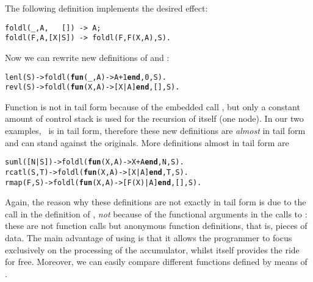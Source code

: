 The following definition implements the desired effect:
\begin{verbatim}
foldl(_,A,   []) -> A;
foldl(F,A,[X|S]) -> foldl(F,F(X,A),S).
\end{verbatim}
Now we can rewrite new definitions of  and
:
\begin{alltt}
lenl(S) -> foldl(\textbf{fun}(\_,A) ->   A+1 \textbf{end}, 0,S).
revl(S) -> foldl(\textbf{fun}(X,A) -> [X|A] \textbf{end},[],S).
\end{alltt}
Function  is not in tail form because of the embedded
call , but only a constant amount of control stack is
used for the recursion of  itself (one node). In our
two examples, ~is in tail form, therefore these new
definitions are \emph{almost} in tail form and can stand against the
originals. More definitions almost in tail form are
\begin{alltt}
suml([N|S]) -> foldl(\textbf{fun}(X,A) ->      X+A \textbf{end}, N,S).
rcatl(S,T)  -> foldl(\textbf{fun}(X,A) ->    [X|A] \textbf{end}, T,S).
rmap(F,S)   -> foldl(\textbf{fun}(X,A) -> [F(X)|A] \textbf{end},[],S).
\end{alltt}
Again, the reason why these definitions are not exactly in tail form
is due to the call  in the definition of
, \emph{not} because of the functional arguments
 in the calls to : these
are not function calls but anonymous function definitions, that is,
pieces of data. The main advantage of using  is that
it allows the programmer to focus exclusively on the processing of the
accumulator, whilst  itself provides the ride for
free. Moreover, we can easily compare different functions defined by
means of .

